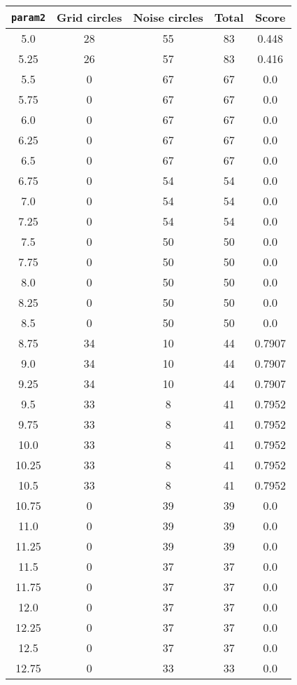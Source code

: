 \documentclass[letterpaper, 12pt]{article}
\begin{document}
\begin{longtable}{|c|c|c|c|c|}
\hline
\textbf{\texttt{param2}} & \textbf{Grid circles} & \textbf{Noise circles} & \textbf{Total} & \textbf{Score} \\
\hline
5.0 & 28 & 55 & 83 & 0.448 \\
\hline
5.25 & 26 & 57 & 83 & 0.416 \\
\hline
5.5 & 0 & 67 & 67 & 0.0 \\
\hline
5.75 & 0 & 67 & 67 & 0.0 \\
\hline
6.0 & 0 & 67 & 67 & 0.0 \\
\hline
6.25 & 0 & 67 & 67 & 0.0 \\
\hline
6.5 & 0 & 67 & 67 & 0.0 \\
\hline
6.75 & 0 & 54 & 54 & 0.0 \\
\hline
7.0 & 0 & 54 & 54 & 0.0 \\
\hline
7.25 & 0 & 54 & 54 & 0.0 \\
\hline
7.5 & 0 & 50 & 50 & 0.0 \\
\hline
7.75 & 0 & 50 & 50 & 0.0 \\
\hline
8.0 & 0 & 50 & 50 & 0.0 \\
\hline
8.25 & 0 & 50 & 50 & 0.0 \\
\hline
8.5 & 0 & 50 & 50 & 0.0 \\
\hline
8.75 & 34 & 10 & 44 & 0.7907 \\
\hline
9.0 & 34 & 10 & 44 & 0.7907 \\
\hline
9.25 & 34 & 10 & 44 & 0.7907 \\
\hline
9.5 & 33 & 8 & 41 & 0.7952 \\
\hline
9.75 & 33 & 8 & 41 & 0.7952 \\
\hline
10.0 & 33 & 8 & 41 & 0.7952 \\
\hline
10.25 & 33 & 8 & 41 & 0.7952 \\
\hline
10.5 & 33 & 8 & 41 & 0.7952 \\
\hline
10.75 & 0 & 39 & 39 & 0.0 \\
\hline
11.0 & 0 & 39 & 39 & 0.0 \\
\hline
11.25 & 0 & 39 & 39 & 0.0 \\
\hline
11.5 & 0 & 37 & 37 & 0.0 \\
\hline
11.75 & 0 & 37 & 37 & 0.0 \\
\hline
12.0 & 0 & 37 & 37 & 0.0 \\
\hline
12.25 & 0 & 37 & 37 & 0.0 \\
\hline
12.5 & 0 & 37 & 37 & 0.0 \\
\hline
12.75 & 0 & 33 & 33 & 0.0 \\

\end{longtable}
\end{document}
